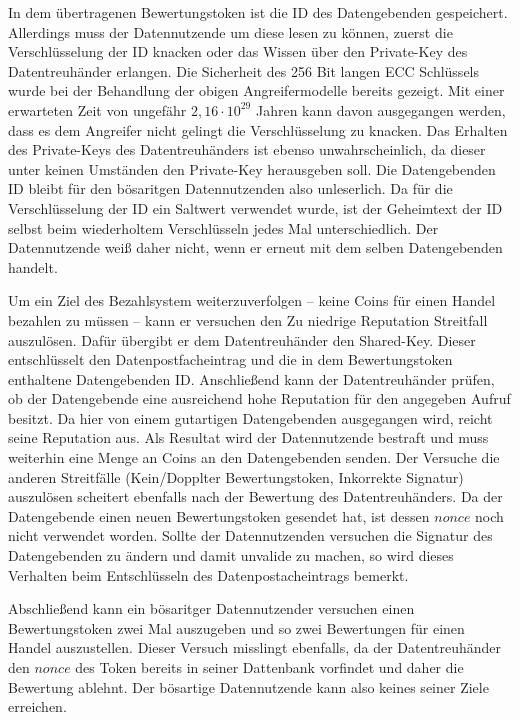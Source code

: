 \documentclass[
	fontsize=12pt,
	headings=small,
	parskip=half,           %
	bibliography=totoc,
	numbers=noenddot,       %
	open=any,               %
]{scrreprt}
\begin{document}
In dem übertragenen Bewertungstoken ist die ID des Datengebenden gespeichert. Allerdings muss der Datennutzende um diese lesen zu können, zuerst die Verschlüsselung der ID knacken oder das Wissen über den Private-Key des Datentreuhänder erlangen. Die Sicherheit des 256 Bit langen ECC Schlüssels wurde bei der Behandlung der obigen Angreifermodelle bereits gezeigt. Mit einer erwarteten Zeit von ungefähr $2,16\cdot10^{29}$ Jahren kann davon ausgegangen werden, dass es dem Angreifer nicht gelingt die Verschlüsselung zu knacken. Das Erhalten des Private-Keys des Datentreuhänders ist ebenso unwahrscheinlich, da dieser unter keinen Umständen den Private-Key herausgeben soll. Die Datengebenden ID bleibt für den bösaritgen Datennutzenden also unleserlich. Da für die Verschlüsselung der ID ein Saltwert verwendet wurde, ist der Geheimtext der ID selbst beim wiederholtem Verschlüsseln jedes Mal unterschiedlich. Der Datennutzende weiß daher nicht, wenn er erneut mit dem selben Datengebenden handelt.

Um ein Ziel des Bezahlsystem weiterzuverfolgen -- keine Coins für einen Handel bezahlen zu müssen -- kann er versuchen den Zu niedrige Reputation Streitfall auszulösen. Dafür übergibt er dem Datentreuhänder den Shared-Key. Dieser entschlüsselt den Datenpostfacheintrag und die in dem Bewertungstoken enthaltene Datengebenden ID. Anschließend kann der Datentreuhänder prüfen, ob der Datengebende eine ausreichend hohe Reputation für den angegeben Aufruf besitzt. Da hier von einem gutartigen Datengebenden ausgegangen wird, reicht seine Reputation aus. Als Resultat wird der Datennutzende bestraft und muss weiterhin eine Menge an Coins an den Datengebenden senden. Der Versuche die anderen Streitfälle (Kein/Dopplter Bewertungstoken, Inkorrekte Signatur) auszulösen scheitert ebenfalls nach der Bewertung des Datentreuhänders. Da der Datengebende einen neuen Bewertungstoken gesendet hat, ist dessen $nonce$ noch nicht verwendet worden. Sollte der Datennutzenden versuchen die Signatur des Datengebenden zu ändern und damit unvalide zu machen, so wird dieses Verhalten beim Entschlüsseln des Datenpostacheintrags bemerkt.

Abschließend kann ein bösaritger Datennutzender versuchen einen Bewertungstoken zwei Mal auszugeben und so zwei Bewertungen für einen Handel auszustellen. Dieser Versuch misslingt ebenfalls, da der Datentreuhänder den $nonce$ des Token bereits in seiner Dattenbank vorfindet und daher die Bewertung ablehnt. Der bösartige Datennutzende kann also keines seiner Ziele erreichen.
\end{document}
